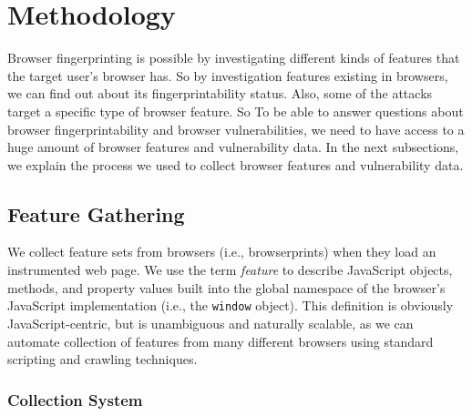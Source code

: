 \section{Methodology}
\label{sec:methodology}

Browser fingerprinting is possible by investigating different kinds of
features that the target user's browser has. So by investigation
features existing in browsers, we can find out about its
fingerprintability status. Also, some of the attacks target a specific
type of browser feature. So To be able to answer questions about
browser fingerprintability and browser vulnerabilities, we need to
have access to a huge amount of browser features and vulnerability
data. In the next subsections, we explain the process we used to
collect browser features and vulnerability data.


\subsection{Feature Gathering}

We collect feature sets from browsers (i.e., browserprints) when they load an instrumented web page.
We use the term \textit{feature} to describe JavaScript objects, methods, and property values built into the global namespace of the browser's JavaScript implementation (i.e., the \texttt{window} object).
This definition is obviously JavaScript-centric, but is unambiguous and naturally scalable, as we can automate collection of features from many different browsers using standard scripting and crawling techniques.


\subsubsection{Collection System}

